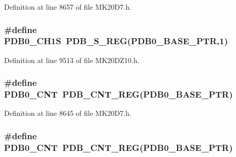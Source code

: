Definition at line 8657 of file M\+K20\+D7.\+h.

\subsubsection[{\texorpdfstring{P\+D\+B0\+\_\+\+C\+H1S}{PDB0_CH1S}}]{\setlength{\rightskip}{0pt plus 5cm}\#define P\+D\+B0\+\_\+\+C\+H1S~{\bf P\+D\+B\+\_\+\+S\+\_\+\+R\+EG}({\bf P\+D\+B0\+\_\+\+B\+A\+S\+E\+\_\+\+P\+TR},1)}\hypertarget{group___p_d_b___register___accessor___macros_gad3c0d0b62b0a7002041438f87fe30816}{}\label{group___p_d_b___register___accessor___macros_gad3c0d0b62b0a7002041438f87fe30816}


Definition at line 9513 of file M\+K20\+D\+Z10.\+h.

\subsubsection[{\texorpdfstring{P\+D\+B0\+\_\+\+C\+NT}{PDB0_CNT}}]{\setlength{\rightskip}{0pt plus 5cm}\#define P\+D\+B0\+\_\+\+C\+NT~{\bf P\+D\+B\+\_\+\+C\+N\+T\+\_\+\+R\+EG}({\bf P\+D\+B0\+\_\+\+B\+A\+S\+E\+\_\+\+P\+TR})}\hypertarget{group___p_d_b___register___accessor___macros_ga8a262bfe42630487eb721630439f6d9f}{}\label{group___p_d_b___register___accessor___macros_ga8a262bfe42630487eb721630439f6d9f}


Definition at line 8645 of file M\+K20\+D7.\+h.

\subsubsection[{\texorpdfstring{P\+D\+B0\+\_\+\+C\+NT}{PDB0_CNT}}]{\setlength{\rightskip}{0pt plus 5cm}\#define P\+D\+B0\+\_\+\+C\+NT~{\bf P\+D\+B\+\_\+\+C\+N\+T\+\_\+\+R\+EG}({\bf P\+D\+B0\+\_\+\+B\+A\+S\+E\+\_\+\+P\+TR})}\hypertarget{group___p_d_b___register___accessor___macros_ga8a262bfe42630487eb721630439f6d9f}{}\label{group___p_d_b___register___accessor___macros_ga8a262bfe42630487eb721630439f6d9f}


